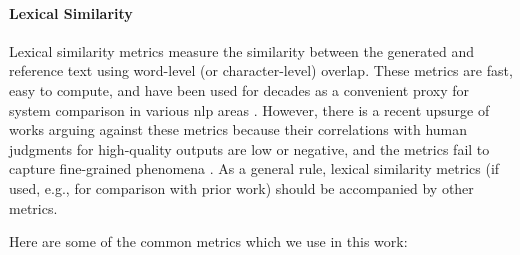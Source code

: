 {\paragraph{Lexical Similarity} Lexical similarity metrics measure the similarity between the generated and reference text using word-level (or character-level) overlap. These metrics are fast, easy to compute, and have been used for decades as a convenient proxy for system comparison in various \ac{nlp} areas \cite{celikyilmazEvaluationTextGeneration2021}. However, there is a recent upsurge of works arguing against these metrics because their correlations with human judgments for high-quality outputs are low or negative, and the metrics fail to capture fine-grained phenomena \cite{mathurTangledBLEUReevaluating2020,kocmiShipNotShip2021,gehrmannRepairingCrackedFoundation2022}. As a general rule, lexical similarity metrics (if used, e.g., for comparison with prior work) should be accompanied by other metrics.

Here are some of the common metrics which we use in this work:

}
